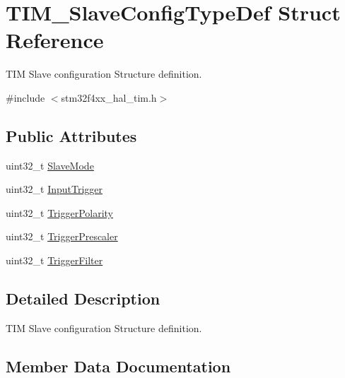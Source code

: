 \hypertarget{struct_t_i_m___slave_config_type_def}{}\section{T\+I\+M\+\_\+\+Slave\+Config\+Type\+Def Struct Reference}
\label{struct_t_i_m___slave_config_type_def}


T\+IM Slave configuration Structure definition.  




{\ttfamily \#include $<$stm32f4xx\+\_\+hal\+\_\+tim.\+h$>$}

\subsection*{Public Attributes}
\begin{DoxyCompactItemize}
\item 
uint32\+\_\+t \hyperlink{struct_t_i_m___slave_config_type_def_a2792de155698128ade1e505618c1bc43}{Slave\+Mode}
\item 
uint32\+\_\+t \hyperlink{struct_t_i_m___slave_config_type_def_a82efdad1e2ed9edbd4c895987ebfe0f7}{Input\+Trigger}
\item 
uint32\+\_\+t \hyperlink{struct_t_i_m___slave_config_type_def_afa8fa1801ef5e13115732a495ef11165}{Trigger\+Polarity}
\item 
uint32\+\_\+t \hyperlink{struct_t_i_m___slave_config_type_def_a57be6d41d77a968f1daeac7b65b1ab4c}{Trigger\+Prescaler}
\item 
uint32\+\_\+t \hyperlink{struct_t_i_m___slave_config_type_def_a07d28f704576a41e37bbb7412e0fba60}{Trigger\+Filter}
\end{DoxyCompactItemize}


\subsection{Detailed Description}
T\+IM Slave configuration Structure definition. 

\subsection{Member Data Documentation}
